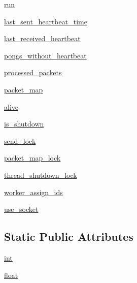 \begin{DoxyCompactItemize}
\item 
\hyperlink{classparlai_1_1mturk_1_1core_1_1socket__manager_1_1SocketManager_aba446fa424239c0b11d19718294e2218}{run}
\item 
\hyperlink{classparlai_1_1mturk_1_1core_1_1socket__manager_1_1SocketManager_a993653c6e53133cda52848cba98ea8d3}{last\+\_\+sent\+\_\+heartbeat\+\_\+time}
\item 
\hyperlink{classparlai_1_1mturk_1_1core_1_1socket__manager_1_1SocketManager_aa94b912fc3574d0db1396b67a922bf27}{last\+\_\+received\+\_\+heartbeat}
\item 
\hyperlink{classparlai_1_1mturk_1_1core_1_1socket__manager_1_1SocketManager_aa65b3174e24e25817c450e4ca6ff65a4}{pongs\+\_\+without\+\_\+heartbeat}
\item 
\hyperlink{classparlai_1_1mturk_1_1core_1_1socket__manager_1_1SocketManager_a5caa5c5113d477505f82ff3d970e8f57}{processed\+\_\+packets}
\item 
\hyperlink{classparlai_1_1mturk_1_1core_1_1socket__manager_1_1SocketManager_af1d018bc78e0f48223e0c24a3e143646}{packet\+\_\+map}
\item 
\hyperlink{classparlai_1_1mturk_1_1core_1_1socket__manager_1_1SocketManager_a7d2578a166632f5e3f9a5902ad312342}{alive}
\item 
\hyperlink{classparlai_1_1mturk_1_1core_1_1socket__manager_1_1SocketManager_abdac51ea8ab1c574d08a8c193f95a87f}{is\+\_\+shutdown}
\item 
\hyperlink{classparlai_1_1mturk_1_1core_1_1socket__manager_1_1SocketManager_a5a6978486abd2356bc7992f5b02deaca}{send\+\_\+lock}
\item 
\hyperlink{classparlai_1_1mturk_1_1core_1_1socket__manager_1_1SocketManager_ad791aec46cde432a30cedaaa66df0bd9}{packet\+\_\+map\+\_\+lock}
\item 
\hyperlink{classparlai_1_1mturk_1_1core_1_1socket__manager_1_1SocketManager_aec23bfb776374f11222f0a3b0fc19879}{thread\+\_\+shutdown\+\_\+lock}
\item 
\hyperlink{classparlai_1_1mturk_1_1core_1_1socket__manager_1_1SocketManager_a12d9338e0893b0941d81365cf2a5cf1b}{worker\+\_\+assign\+\_\+ids}
\item 
\hyperlink{classparlai_1_1mturk_1_1core_1_1socket__manager_1_1SocketManager_a73c0ecae39b965eb20d44b8e66bd6947}{use\+\_\+socket}
\end{DoxyCompactItemize}
\subsection*{Static Public Attributes}
\begin{DoxyCompactItemize}
\item 
\hyperlink{classparlai_1_1mturk_1_1core_1_1socket__manager_1_1SocketManager_a04445fa5e12057459d0f1edbe622cc90}{int}
\item 
\hyperlink{classparlai_1_1mturk_1_1core_1_1socket__manager_1_1SocketManager_a4e9e1aac15e9b4e0143e508167c27fbe}{float}
\end{DoxyCompactItemize}


